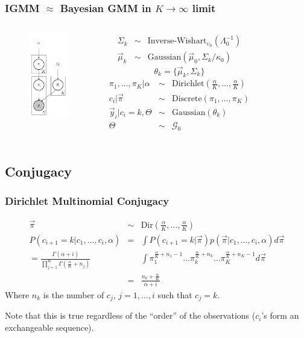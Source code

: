 \documentclass{beamer}
\begin{document}
\begin{frame}
\frametitle{IGMM $\approx$ Bayesian GMM in $K \rightarrow \infty$ limit}
\begin{columns}[t]
\begin{center}
\begin{figure}
\includegraphics[height=3.75cm]{figures/bgmm_graphical_model.pdf}
\end{figure}
\end{center}
{\tiny
\begin{eqnarray*}
 \Sigma_k &\sim& \mbox{Inverse-Wishart}_{\upsilon_0}( \Lambda_0^{-1}) \\ 
\vec \mu_k &\sim& \mbox{Gaussian}(\vec \mu_0,  \Sigma_k/\kappa_0)
\end{eqnarray*}
\[\theta_k = \{\vec \mu_k,\Sigma_k\}\]
\begin{eqnarray*}
\pi_1, \ldots, \pi_K | \alpha &\sim& \mbox{Dirichlet}(\frac{\alpha}{K}, \ldots, \frac{\alpha}{K}) \\
c_i | \vec \pi &\sim& \mbox{Discrete}(\pi_1, \ldots, \pi_K) \\
\vec y_i | c_i=k, \Theta &\sim& \mbox{Gaussian}(\theta_k) \\
\Theta &\sim& \mathcal{G}_0 \\
\end{eqnarray*}
}
\end{columns}

\end{frame}



\subsection{Conjugacy}
\begin{frame}[t]
\frametitle{Dirichlet Multinomial Conjugacy}
\begin{eqnarray*}
\vec{\pi} & \sim & \text{Dir}\left(\frac{\alpha}{K},\ldots,\frac{\alpha}{K}\right) \\
P(c_{i+1} = k|c_1,\ldots,c_{i},\alpha) & = & \int P(c_{i+1} = k | \vec{\pi}) p(\vec{\pi}|c_1,\ldots,c_{i},\alpha) d\vec{\pi} \\
= \frac{\Gamma(\alpha + i )}{\prod_{j=1}^{K}\Gamma(\frac{\alpha}{K} + n_j)} &&\int\pi_1^{\frac{\alpha}{K}+n_1 -1}\ldots\pi_k^{\frac{\alpha}{K}+n_k}\ldots\pi_K^{\frac{\alpha}{K}+n_K-1}d\vec{\pi} \\
& = & \frac{n_k + \frac{\alpha}{K}}{\alpha + i}
\end{eqnarray*}
Where $n_k$ is the number of $c_j$, $j = 1,\ldots,i$ such that $c_j = k$.   
\newline

Note that this is true regardless of the ``order'' of the observations ($c_i$'s form an exchangeable sequence).
\end{frame}
\end{document}

